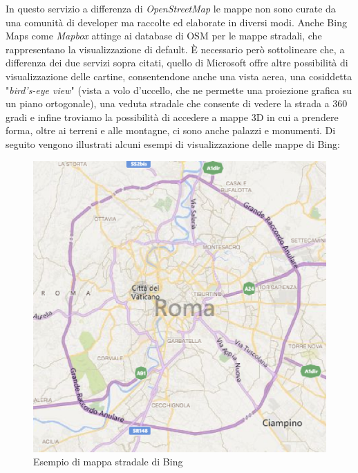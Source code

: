 In questo servizio a differenza di \textit{OpenStreetMap} le mappe non sono curate da una comunità di developer ma raccolte ed elaborate in diversi modi. Anche Bing Maps come \textit{Mapbox} attinge ai database di OSM per le mappe stradali, che rappresentano la visualizzazione di default. È necessario però sottolineare che, a differenza dei due servizi sopra citati, quello di Microsoft offre altre possibilità di visualizzazione delle cartine, consentendone anche una vista aerea, una cosiddetta "\textit{bird's-eye view}" (vista a volo d'uccello, che ne permette una proiezione grafica su un piano ortogonale), una veduta stradale che consente di vedere la strada a 360 gradi e infine troviamo la possibilità di accedere a mappe 3D in cui a prendere forma, oltre ai terreni e alle montagne, ci sono anche palazzi e monumenti. Di seguito vengono illustrati alcuni esempi di visualizzazione delle mappe di Bing:

\begin{figure}[ht]
	\centering
	\includegraphics[scale=0.4]{figure/BINGRoadmap.eps}
	\caption{Esempio di mappa stradale di Bing}\label{fig:BINGRoadmap}
\end{figure}

